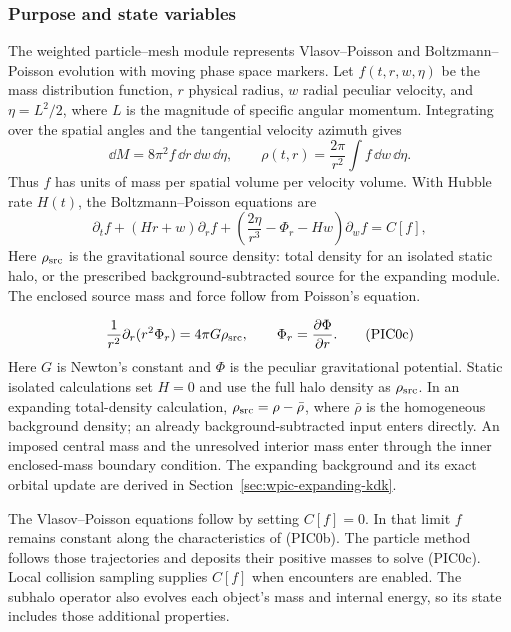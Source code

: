 \subsubsection{Purpose and state variables}
\label{sec:wpic-continuum}

The weighted particle--mesh module represents Vlasov--Poisson and
Boltzmann--Poisson evolution with moving phase space markers.  Let
\(f(t,r,w,\eta)\) be the mass distribution function, \(r\) physical radius,
\(w\) radial peculiar velocity, and \(\eta=L^2/2\), where \(L\) is the
magnitude of specific angular momentum.  Integrating over the spatial angles
and the tangential velocity azimuth gives
\[
 \dd M=8\pi^2 f\,\dd r\,\dd w\,\dd\eta,
 \qquad \rho(t,r)=\frac{2\pi}{r^2}\int f\,\dd w\,\dd\eta .
                                                               \tag{PIC0a}
\]
Thus \(f\) has units of mass per spatial volume per velocity volume.  With
Hubble rate \(H(t)\), the Boltzmann--Poisson equations are
\[
 \partial_t f+(Hr+w)\partial_r f+
 \left(\frac{2\eta}{r^3}-\Phi_r-Hw\right)\partial_w f=C[f],
                                                               \tag{PIC0b}
\]
Here \(\rho_{\rm src}\) is the gravitational source density: total density
for an isolated static halo, or the prescribed background-subtracted source
for the expanding module. The enclosed source mass and force follow from
Poisson's equation.

\[
 \frac1{r^2}\partial_r(r^2\Phi_r)=4\pi G\rho_{\rm src},
 \qquad \Phi_r=\frac{\partial\Phi}{\partial r}.          \tag{PIC0c}
\]
Here \(G\) is Newton's constant and \(\Phi\) is the peculiar gravitational
potential.  Static isolated calculations set \(H=0\) and use the full halo
density as \(\rho_{\rm src}\).  In an expanding total-density calculation,
\(\rho_{\rm src}=\rho-\bar\rho\), where \(\bar\rho\) is the homogeneous
background density; an already background-subtracted input enters directly.
An imposed central mass and the unresolved interior mass enter through the
inner enclosed-mass boundary condition.  The expanding background and its
exact orbital update are derived in Section~\ref{sec:wpic-expanding-kdk}.

The Vlasov--Poisson equations follow by setting \(C[f]=0\).  In that limit
\(f\) remains constant along the characteristics of (PIC0b).  The particle
method follows those trajectories and deposits their positive masses to
solve (PIC0c).  Local collision sampling supplies \(C[f]\) when encounters
are enabled.  The subhalo operator also evolves each object's mass
and internal energy, so its state includes those additional properties.

